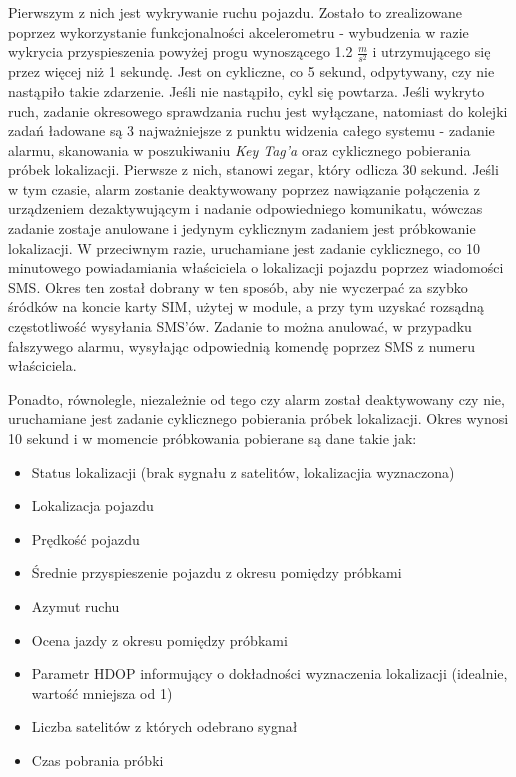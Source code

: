 Pierwszym z nich jest wykrywanie ruchu pojazdu. Zostało to zrealizowane poprzez wykorzystanie funkcjonalności akcelerometru - wybudzenia w razie wykrycia przyspieszenia powyżej progu wynoszącego 1.2 $\frac{m}{s^2}$ i utrzymującego się przez więcej niż 1 sekundę. Jest on cykliczne, co 5 sekund, odpytywany, czy nie nastąpiło takie zdarzenie. Jeśli nie nastąpiło, cykl się powtarza. Jeśli wykryto ruch, zadanie okresowego sprawdzania ruchu jest wyłączane, natomiast do kolejki zadań ładowane są 3 najważniejsze z punktu widzenia całego systemu - zadanie alarmu, skanowania w poszukiwaniu \textit{Key Tag'a} oraz cyklicznego pobierania próbek lokalizacji. Pierwsze z nich, stanowi zegar, który odlicza 30 sekund. Jeśli w tym czasie, alarm zostanie deaktywowany poprzez nawiązanie połączenia z urządzeniem dezaktywującym i nadanie odpowiedniego komunikatu, wówczas zadanie zostaje anulowane i jedynym cyklicznym zadaniem jest próbkowanie lokalizacji. W przeciwnym razie, uruchamiane jest zadanie cyklicznego, co 10 minutowego powiadamiania właściciela o lokalizacji pojazdu poprzez wiadomości SMS. Okres ten został dobrany w ten sposób, aby nie wyczerpać za szybko śródków na koncie karty SIM, użytej w module, a przy tym uzyskać rozsądną częstotliwość wysyłania SMS'ów. Zadanie to można anulować, w przypadku fałszywego alarmu, wysyłając odpowiednią komendę poprzez SMS z numeru właściciela. 

Ponadto, równolegle, niezależnie od tego czy alarm został deaktywowany czy nie, uruchamiane jest zadanie cyklicznego pobierania próbek lokalizacji. Okres wynosi 10 sekund i w momencie próbkowania pobierane są dane takie jak:

\begin{itemize}
\item Status lokalizacji (brak sygnału z satelitów, lokalizacjia wyznaczona)
\item Lokalizacja pojazdu
\item Prędkość pojazdu
\item Średnie przyspieszenie pojazdu z okresu pomiędzy próbkami
\item Azymut ruchu
\item Ocena jazdy z okresu pomiędzy próbkami
\item Parametr HDOP informujący o dokładności wyznaczenia lokalizacji (idealnie, wartość mniejsza od 1)
\item Liczba satelitów z których odebrano sygnał
\item Czas pobrania próbki
\end{itemize}

